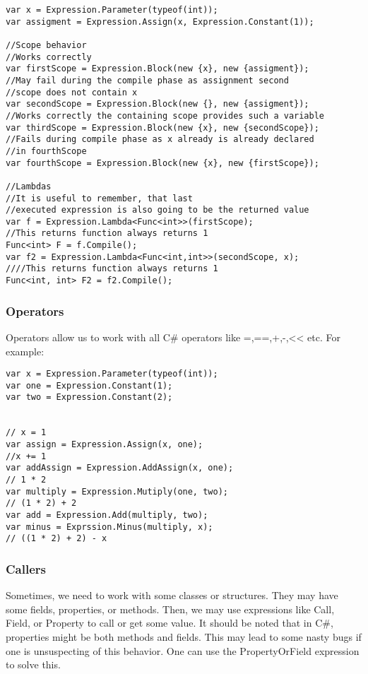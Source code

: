 \begin{lstlisting}
var x = Expression.Parameter(typeof(int));
var assigment = Expression.Assign(x, Expression.Constant(1));

//Scope behavior
//Works correctly
var firstScope = Expression.Block(new {x}, new {assigment});
//May fail during the compile phase as assignment second 
//scope does not contain x 
var secondScope = Expression.Block(new {}, new {assigment});
//Works correctly the containing scope provides such a variable
var thirdScope = Expression.Block(new {x}, new {secondScope});
//Fails during compile phase as x already is already declared
//in fourthScope
var fourthScope = Expression.Block(new {x}, new {firstScope});

//Lambdas
//It is useful to remember, that last 
//executed expression is also going to be the returned value
var f = Expression.Lambda<Func<int>>(firstScope);
//This returns function always returns 1 
Func<int> F = f.Compile();
var f2 = Expression.Lambda<Func<int,int>>(secondScope, x);
////This returns function always returns 1 
Func<int, int> F2 = f2.Compile();
\end{lstlisting}

\subsubsection{Operators}
Operators allow us to work with all C\# operators like =,==,+,-,<< etc. For example:
\begin{lstlisting}
var x = Expression.Parameter(typeof(int));
var one = Expression.Constant(1);
var two = Expression.Constant(2);


// x = 1
var assign = Expression.Assign(x, one);
//x += 1
var addAssign = Expression.AddAssign(x, one);
// 1 * 2
var multiply = Expression.Mutiply(one, two);
// (1 * 2) + 2
var add = Expression.Add(multiply, two);
var minus = Exprssion.Minus(multiply, x);
// ((1 * 2) + 2) - x
\end{lstlisting}
\subsubsection{Callers}
Sometimes, we need to work with some classes or structures. They may have some fields, properties, or methods. Then, we may use expressions like Call, Field, or Property to call or get some value. It should be noted that in C\#, properties might be both methods and fields. This may lead to some nasty bugs if one is unsuspecting of this behavior. One can use the PropertyOrField expression to solve this.

